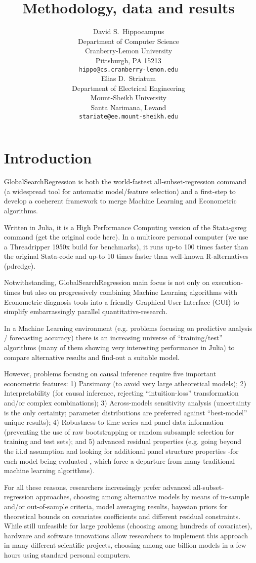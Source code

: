 \documentclass{article}
\title{Methodology, data and results}
\author{
  David S.~Hippocampus \\
  Department of Computer Science\\
  Cranberry-Lemon University\\
  Pittsburgh, PA 15213 \\
  \texttt{hippo@cs.cranberry-lemon.edu} \\
  \And
 Elias D.~Striatum \\
  Department of Electrical Engineering\\
  Mount-Sheikh University\\
  Santa Narimana, Levand \\
  \texttt{stariate@ee.mount-sheikh.edu} \\
}
\begin{document}
\maketitle

\section{Introduction}

GlobalSearchRegression is both the world-fastest all-subset-regression command (a widespread tool for automatic model/feature selection) and a first-step to develop a coeherent framework to merge Machine Learning and Econometric algorithms.

Written in Julia, it is a High Performance Computing version of the Stata-gsreg command (get the original code here). In a multicore personal computer (we use a Threadripper 1950x build for benchmarks), it runs up-to 100 times faster than the original Stata-code and up-to 10 times faster than well-known R-alternatives (pdredge).

Notwithstanding, GlobalSearchRegression main focus is not only on execution-times but also on progressively combining Machine Learning algorithms with Econometric diagnosis tools into a friendly Graphical User Interface (GUI) to simplify embarrassingly parallel quantitative-research.

In a Machine Learning environment (e.g. problems focusing on predictive analysis / forecasting accuracy) there is an increasing universe of “training/test” algorithms (many of them showing very interesting performance in Julia) to compare alternative results and find-out a suitable model.

However, problems focusing on causal inference require five important econometric features: 1) Parsimony (to avoid very large atheoretical models); 2) Interpretability (for causal inference, rejecting “intuition-loss” transformation and/or complex combinations); 3) Across-models sensitivity analysis (uncertainty is the only certainty; parameter distributions are preferred against “best-model” unique results); 4) Robustness to time series and panel data information (preventing the use of raw bootstrapping or random subsample selection for training and test sets); and 5) advanced residual properties (e.g. going beyond the i.i.d assumption and looking for additional panel structure properties -for each model being evaluated-, which force a departure from many traditional machine learning algorithms).

For all these reasons, researchers increasingly prefer advanced all-subset-regression approaches, choosing among alternative models by means of in-sample and/or out-of-sample criteria, model averaging results, bayesian priors for theoretical bounds on covariates coefficients and different residual constraints. While still unfeasible for large problems (choosing among hundreds of covariates), hardware and software innovations allow researchers to implement this approach in many different scientific projects, choosing among one billion models in a few hours using standard personal computers.
\end{document}

